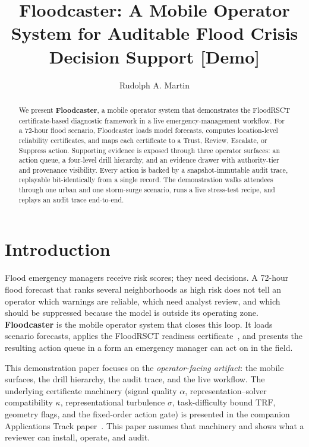 \documentclass[sigconf,nonacm=true,review,authoryear]{acmart}
\title{Floodcaster: A Mobile Operator System for Auditable
  Flood Crisis Decision Support [Demo]}
\author{Rudolph A. Martin}
\affiliation{%
  \institution{Next Shift Consulting LLC}
  \city{Madison}
  \state{Wisconsin}
  \country{USA}
}
\begin{document}
\begin{abstract}
We present \textbf{Floodcaster}, a mobile operator system that
demonstrates the FloodRSCT certificate-based diagnostic framework
\citep{martin2026floodrsct} in a live emergency-management workflow.
For a 72-hour flood scenario, Floodcaster loads model forecasts,
computes location-level reliability certificates, and maps each
certificate to a Trust, Review, Escalate, or Suppress action.
Supporting evidence is exposed through three operator surfaces:
an action queue, a four-level drill hierarchy, and an evidence
drawer with authority-tier and provenance visibility. Every action
is backed by a snapshot-immutable audit trace, replayable
bit-identically from a single record. The demonstration walks
attendees through one urban and one storm-surge scenario, runs a
live stress-test recipe, and replays an audit trace end-to-end.
\end{abstract}


\maketitle

\section{Introduction}
\label{sec:demo-intro}

Flood emergency managers receive risk scores; they need decisions.
A 72-hour flood forecast that ranks several neighborhoods as high risk
does not tell an operator which warnings are reliable, which need
analyst review, and which should be suppressed because the model is
outside its operating zone. \textbf{Floodcaster} is the mobile
operator system that closes this loop. It loads scenario forecasts,
applies the FloodRSCT readiness
certificate~\citep{martin2026floodrsct}, and presents the resulting
action queue in a form an emergency manager can act on in the field.

This demonstration paper focuses on the \emph{operator-facing
artifact}: the mobile surfaces, the drill hierarchy, the audit trace,
and the live workflow. The underlying certificate machinery (signal
quality $\alpha$, representation--solver compatibility $\kappa$,
representational turbulence $\sigma$, task-difficulty bound
$\mathrm{TRF}$, geometry flags, and the fixed-order action gate)
is presented in the companion Applications Track
paper~\citep{martin2026floodrsct}. This paper assumes that machinery
and shows what a reviewer can install, operate, and audit.
\end{document}
